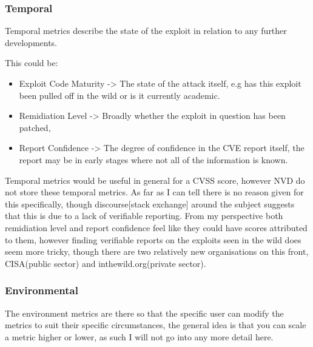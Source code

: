 \documentclass[11pt]{article}
\begin{document}
\subsubsection*{Temporal}

Temporal metrics describe the state of the exploit in relation to any further developments.

\bigskip

This could be:
\begin{itemize}

	\item Exploit Code Maturity -> The state of the attack itself, e.g has this exploit been pulled off in the wild or is it currently academic.

	\item Remidiation Level -> Broadly whether the exploit in question has been patched,

	\item Report Confidence -> The degree of confidence in the CVE report itself, the report may be in early stages where not all of the
	      information is known.

\end{itemize}

Temporal metrics would be useful in general for a CVSS score, however NVD do not store these temporal metrics. As far as
I can tell there is no reason given for this specifically, though discourse[stack exchange] around the subject suggests that this is due
to a lack of verifiable reporting. From my perspective both remidiation level and report confidence feel like they could
have scores attributed to them, however finding verifiable reports on the exploits seen in the wild does seem more
tricky, though there are two relatively new organisations on this front, CISA(public sector) and inthewild.org(private
sector).

\subsubsection*{Environmental}

The environment metrics are there so that the specific user can modify the metrics to suit their specific circumstances,
the general idea is that you can scale a metric higher or lower, as such I will not go into any more detail here.
\end{document}
